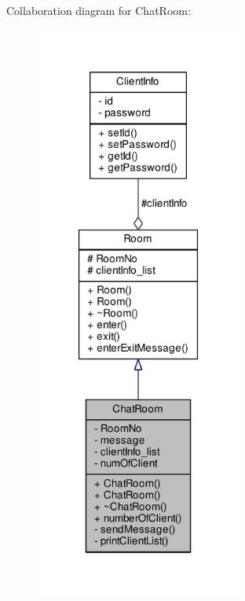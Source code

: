 Collaboration diagram for Chat\+Room\+:
\nopagebreak
\begin{figure}[H]
\begin{center}
\leavevmode
\includegraphics[width=192pt]{class_chat_room__coll__graph}
\end{center}
\end{figure}
